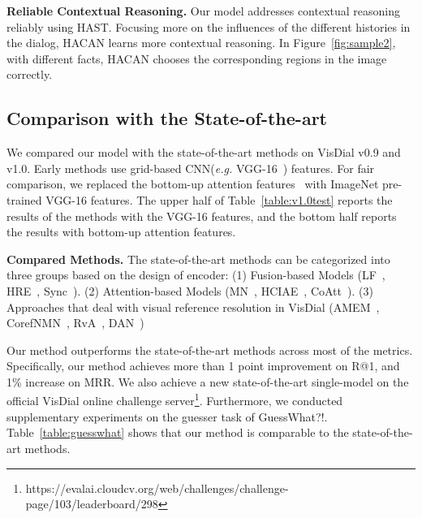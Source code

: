 \documentclass[10pt,twocolumn,letterpaper]{article}
\begin{document}
\noindent \textbf{Reliable Contextual Reasoning.} Our model addresses contextual reasoning reliably using HAST. Focusing more on the influences of the different histories in the dialog, HACAN learns more contextual reasoning. In Figure~\ref{fig:sample2}, with different facts, HACAN chooses the corresponding regions in the image correctly. 

\subsection{Comparison with the State-of-the-art}
We compared our model with the state-of-the-art methods on VisDial v0.9 and v1.0. Early methods use grid-based CNN(\emph{e.g.} VGG-16~\cite{simonyan2014very}) features. For fair comparison, we replaced the bottom-up attention features~\cite{anderson2017bottom} with ImageNet pre-trained VGG-16 features. The upper half of Table~\ref{table:v1.0test} reports the results of the methods with the VGG-16 features, and the bottom half reports the results with bottom-up attention features. 

\noindent \textbf{Compared Methods.} The state-of-the-art methods can be categorized into three groups based on the design of encoder: (1) Fusion-based Models (LF~\cite{das2017visual}, HRE~\cite{das2017visual}, Sync~\cite{guo2019image}). (2) Attention-based Models (MN~\cite{das2017visual}, HCIAE~\cite{lu2017best}, CoAtt~\cite{lu2016hierarchical}). (3) Approaches that deal with visual reference resolution in VisDial (AMEM~\cite{seo2017visual}, CorefNMN~\cite{kottur2018visual}, RvA~\cite{kang2019dual}, DAN~\cite{kang2019dual})

Our method outperforms the state-of-the-art methods across most of the metrics. Specifically, our method achieves more than 1 point improvement on R@1, and 1\% increase on MRR. We also achieve a new state-of-the-art single-model on the official VisDial online challenge server\footnote{https://evalai.cloudcv.org/web/challenges/challenge-page/103/leaderboard/298}.
Furthermore, we conducted supplementary experiments on the guesser task of GuessWhat?!. Table~\ref{table:guesswhat} shows that our method is comparable to the state-of-the-art methods.
\end{document}
